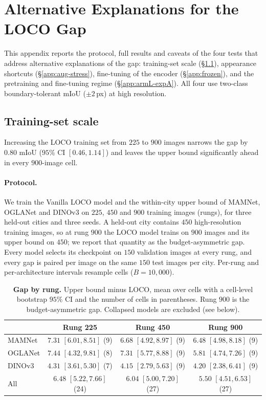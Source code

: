 \section{Alternative Explanations for the LOCO Gap}
\label{app:alternatives}

This appendix reports the protocol, full results and caveats of the four
tests that address alternative explanations of the gap: training-set scale
(\S\ref{app:ladder}), appearance shortcuts (\S\ref{app:aug-stress}),
fine-tuning of the encoder (\S\ref{app:frozen}), and the pretraining and
fine-tuning regime (\S\ref{app:armL-expA}).  All four use two-class
boundary-tolerant mIoU ($\pm 2$\,px) at high resolution.

\subsection{Training-set scale}
\label{app:ladder}

Increasing the LOCO training set from $225$ to $900$ images narrows the gap by
$0.80$ mIoU ($95\%$ CI $[0.46, 1.14]$) and leaves the upper bound significantly
ahead in every $900$-image cell.

\paragraph{Protocol.} We train the Vanilla LOCO model and the within-city upper
bound of MAMNet, OGLANet and DINOv3 on $225$, $450$ and $900$ training images
(rungs), for three held-out cities and three seeds.  A held-out city contains
$450$ high-resolution training images, so at rung $900$ the LOCO model trains on
$900$ images and its upper bound on $450$; we report that quantity as the
budget-asymmetric gap.  Every model selects its checkpoint on $150$ validation
images at every rung, and every gap is paired per image on the same $150$ test
images per city.  Per-rung and per-architecture intervals resample cells
($B{=}10{,}000$).

\begin{table}[h]
\centering
\caption{\textbf{Gap by rung.} Upper bound minus LOCO, mean over cells with a
cell-level bootstrap $95\%$ CI and the number of cells in parentheses.  Rung
$900$ is the budget-asymmetric gap.  Collapsed models are excluded (see below).}
\label{tab:ladder}
\small
\setlength{\tabcolsep}{4pt}
\begin{tabular}{lccc}
\toprule
& Rung 225 & Rung 450 & Rung 900 \\
\midrule
MAMNet & $7.31$ $[6.01, 8.51]$ (9) & $6.68$ $[4.92, 8.97]$ (9) & $6.48$ $[4.98, 8.18]$ (9) \\
OGLANet & $7.44$ $[4.32, 9.81]$ (8) & $7.31$ $[5.77, 8.88]$ (9) & $5.81$ $[4.74, 7.26]$ (9) \\
DINOv3 & $4.31$ $[3.61, 5.30]$ (7) & $4.15$ $[2.79, 5.63]$ (9) & $4.20$ $[2.38, 6.41]$ (9) \\
\midrule
All & $6.48$ $[5.22, 7.66]$ (24) & $6.04$ $[5.00, 7.20]$ (27) & $5.50$ $[4.51, 6.53]$ (27) \\
\bottomrule
\end{tabular}
\end{table}

